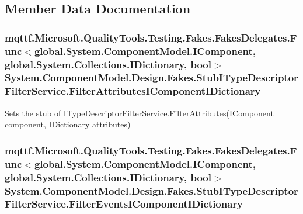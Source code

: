\subsection{Member Data Documentation}
\hypertarget{class_system_1_1_component_model_1_1_design_1_1_fakes_1_1_stub_i_type_descriptor_filter_service_ad4b91d84616520e159beb7b4aa13b9ea}{
\subsubsection[{Filter\-Attributes\-I\-Component\-I\-Dictionary}]{\setlength{\rightskip}{0pt plus 5cm}mqttf.\-Microsoft.\-Quality\-Tools.\-Testing.\-Fakes.\-Fakes\-Delegates.\-Func$<$global.\-System.\-Component\-Model.\-I\-Component, global.\-System.\-Collections.\-I\-Dictionary, bool$>$ System.\-Component\-Model.\-Design.\-Fakes.\-Stub\-I\-Type\-Descriptor\-Filter\-Service.\-Filter\-Attributes\-I\-Component\-I\-Dictionary}}\label{class_system_1_1_component_model_1_1_design_1_1_fakes_1_1_stub_i_type_descriptor_filter_service_ad4b91d84616520e159beb7b4aa13b9ea}


Sets the stub of I\-Type\-Descriptor\-Filter\-Service.\-Filter\-Attributes(\-I\-Component component, I\-Dictionary attributes)

\hypertarget{class_system_1_1_component_model_1_1_design_1_1_fakes_1_1_stub_i_type_descriptor_filter_service_af873aebaa5537559835b92ab46092a71}{
\subsubsection[{Filter\-Events\-I\-Component\-I\-Dictionary}]{\setlength{\rightskip}{0pt plus 5cm}mqttf.\-Microsoft.\-Quality\-Tools.\-Testing.\-Fakes.\-Fakes\-Delegates.\-Func$<$global.\-System.\-Component\-Model.\-I\-Component, global.\-System.\-Collections.\-I\-Dictionary, bool$>$ System.\-Component\-Model.\-Design.\-Fakes.\-Stub\-I\-Type\-Descriptor\-Filter\-Service.\-Filter\-Events\-I\-Component\-I\-Dictionary}}\label{class_system_1_1_component_model_1_1_design_1_1_fakes_1_1_stub_i_type_descriptor_filter_service_af873aebaa5537559835b92ab46092a71}


